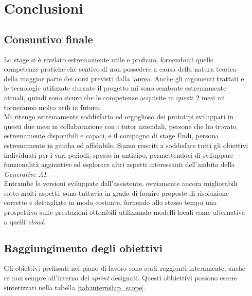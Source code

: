 \chapter{Conclusioni}
\label{chap:conclusioni}

\section{Consuntivo finale}
Lo stage si è rivelato estremamente utile e proficuo, fornendomi quelle 
competenze pratiche che sentivo di non possedere a causa della natura teorica 
della maggior parte dei corsi previsti dalla laurea.
Anche gli argomenti trattati e le tecnologie utilizzate durante il progetto mi sono sembrate estremamente attuali, quindi sono sicuro che le competenze 
acquisite in questi 2 mesi mi torneranno molto utili in futuro.\\
Mi ritengo estremamente soddisfatto ed orgoglioso dei prototipi sviluppati in questi due mesi in collaborazione con i tutor aziendali, persone che ho 
trovato estremamente disponibili e capaci, e il compagno di stage Endi, 
persona estremamente in gamba ed affidabile. Siamo riusciti a soddisfare tutti 
gli obiettivi individuati per i vari periodi, spesso in anticipo, 
permettendoci di sviluppare funzionalità aggiuntive ed 
esplorare altri aspetti interessanti dell'ambito della \textit{Generative AI}.\\
Entrambe le versioni sviluppate dall'assistente, ovviamente ancora 
migliorabili sotto molti aspetti, sono tuttavia in grado di fornire proposte 
di risoluzione corrette e dettagliate in modo costante, fornendo allo stesso 
tempo una prospettiva sulle prestazioni ottenibili utilizzando modelli locali 
come alternativa a quelli \textit{cloud}.

\section{Raggiungimento degli obiettivi}
Gli obiettivi prefissati nel piano di lavoro sono stati raggiunti interamente, anche se non sempre all'interno dei \textit{sprint} designati.
Questi obbiettivi possono essere sintetizzati nella tabella \ref{tab:internship_scope}.

